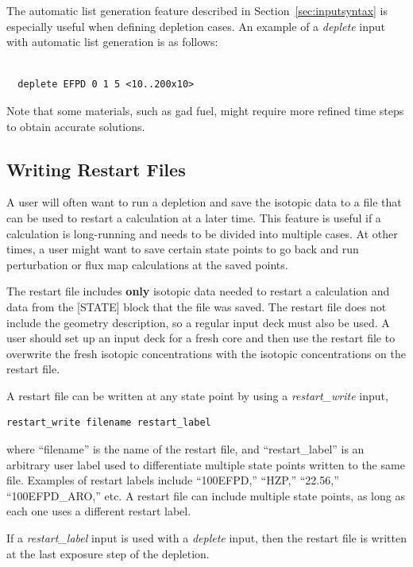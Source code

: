 The automatic list generation feature described in Section~\ref{sec:inputsyntax} is especially
useful when defining depletion cases. An example of a {\it deplete} input with automatic list
generation is as follows:
\begin{Verbatim}[fontsize=\small]

  deplete EFPD 0 1 5 <10..200x10>

\end{Verbatim}

Note that some materials, such as gad fuel, might require more refined time steps to obtain accurate solutions.

\subsection{Writing Restart Files}

A user will often want to run a depletion and save the isotopic data to a file that can be used to
restart a calculation at a later time. This feature is useful if a calculation is long-running and needs to be
divided into multiple cases. At other times, a user might want to save certain state points to go
back and run perturbation or flux map calculations at the saved points.

The restart file includes {\bf only} isotopic data needed to restart a calculation and
data from the [STATE] block that the file was saved.
The restart file does not include the geometry description, so a regular input deck must also be used.
A user should set up an input deck for a fresh core and then use the restart file to
overwrite the fresh isotopic concentrations with the isotopic concentrations on the restart file.

A restart file can be written at any state point by using a {\it restart\_write} input,
\begin{Verbatim}[fontsize=\small]
  restart_write filename restart_label

\end{Verbatim}
where ``filename'' is the name of the restart file, and ``restart\_label'' is an arbitrary user label used
to differentiate multiple state points written to the same file. Examples of restart labels
include ``100EFPD,'' ``HZP,'' ``22.56,'' ``100EFPD\_ARO,'' etc.
A restart file can include multiple state points, as long as each one uses a different restart label.

If a {\it restart\_label} input is used with a {\it deplete} input, then the restart file is written at the last
exposure step of the depletion.

